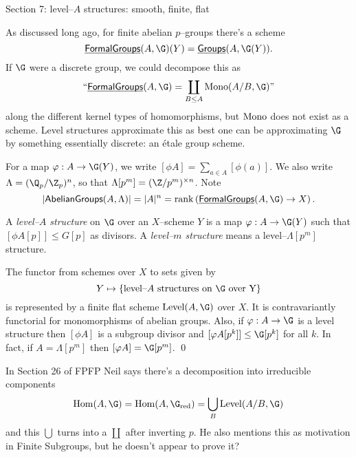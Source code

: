 Section 7: level--$A$ structures: smooth, finite, flat

As discussed long ago, for finite abelian $p$--groups there's a scheme \[\InternalHom{FormalGroups}(A, \G)(Y) = \InternalHom{Groups}(A, \G(Y)).\]  If $\G$ were a discrete group, we could decompose this as \[\text{``$\InternalHom{FormalGroups}(A, \G) = \coprod_{B \le A} \Mono(A/B, \G)$''}\] along the different kernel types of homomorphisms, but $\operatorname{Mono}$ does not exist as a scheme.  Level structures approximate this as best one can be approximating $\G$ by something essentially discrete: an \'etale group scheme.

For a map $\phi: A \to \G(Y)$, we write $[\phi A] = \sum_{a \in A}[\phi(a)]$.  We also write $\Lambda = (\Q_p / \Z_p)^n$, so that $\Lambda[p^m] = (\Z/p^m)^{\times n}$.  Note \[|\CatOf{AbelianGroups}(A, \Lambda)| = |A|^n = \operatorname{rank} \left( \InternalHom{FormalGroups}(A, \G) \to X \right).\]

\begin{definition}
A \textit{level--$A$ structure} on $\G$ over an $X$--scheme $Y$ is a map $\phi: A \to \G(Y)$ such that $[\phi A[p]] \le G[p]$ as divisors.  A \textit{level--$m$ structure} means a level--$\Lambda[p^m]$ structure.
\end{definition}

\begin{lemma}
The functor from schemes over $X$ to sets given by \[Y \mapsto \{\text{level--$A$ structures on $\G$ over Y}\}\] is represented by a finite flat scheme $\Level(A, \G)$ over $X$.  It is contravariantly functorial for monomorphisms of abelian groups.  Also, if $\phi: A \to \G$ is a level structure then $[\phi A]$ is a subgroup divisor and $[\phi A[p^k]] \le \G[p^k]$ for all $k$.  In fact, if $A = \Lambda[p^m]$ then $[\phi A] = \G[p^m]$.  \qed  {}
\end{lemma}

In Section 26 of FPFP Neil says there's a decomposition into irreducible components \[\operatorname{Hom}(A, \G) = \operatorname{Hom}(A, \G_{\mathrm{red}}) = \bigcup_B \Level(A/B, \G)\] and this $\bigcup$ turns into a $\coprod$ after inverting $p$.  He also mentions this as motivation in Finite Subgroups, but he doesn't appear to prove it?

